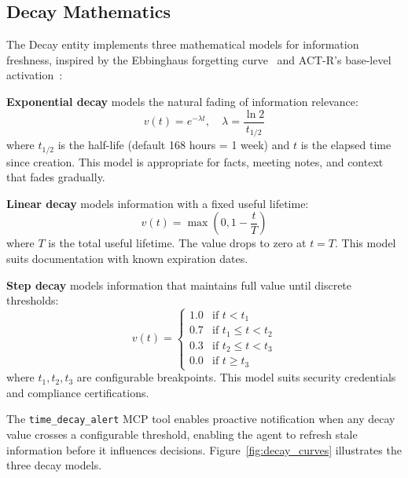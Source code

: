 \documentclass[10pt, twocolumn]{article}
\begin{document}
\subsection{Decay Mathematics}
\label{sec:decay}

The Decay entity implements three mathematical models for information freshness, inspired by the Ebbinghaus forgetting curve~\cite{ebbinghaus1885} and ACT-R's base-level activation~\cite{anderson2004integrated}:

\textbf{Exponential decay} models the natural fading of information relevance:
\begin{equation}
v(t) = e^{-\lambda t}, \quad \lambda = \frac{\ln 2}{t_{1/2}}
\label{eq:exponential}
\end{equation}
where $t_{1/2}$ is the half-life (default 168 hours = 1 week) and $t$ is the elapsed time since creation. This model is appropriate for facts, meeting notes, and context that fades gradually.

\textbf{Linear decay} models information with a fixed useful lifetime:
\begin{equation}
v(t) = \max\left(0, 1 - \frac{t}{T}\right)
\label{eq:linear}
\end{equation}
where $T$ is the total useful lifetime. The value drops to zero at $t = T$. This model suits documentation with known expiration dates.

\textbf{Step decay} models information that maintains full value until discrete thresholds:
\begin{equation}
v(t) = \begin{cases} 1.0 & \text{if } t < t_1 \\ 0.7 & \text{if } t_1 \le t < t_2 \\ 0.3 & \text{if } t_2 \le t < t_3 \\ 0.0 & \text{if } t \ge t_3 \end{cases}
\label{eq:step}
\end{equation}
where $t_1, t_2, t_3$ are configurable breakpoints. This model suits security credentials and compliance certifications.

The \texttt{time\_decay\_alert} MCP tool enables proactive notification when any decay value crosses a configurable threshold, enabling the agent to refresh stale information before it influences decisions. Figure~\ref{fig:decay_curves} illustrates the three decay models.
\end{document}
